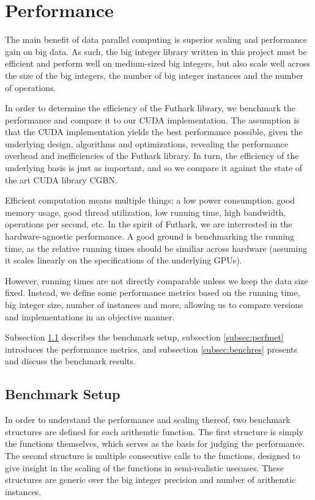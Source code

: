 \section{Performance}
\label{sec:per}

The main benefit of data parallel computing is superior scaling and performance
gain on big data. As such, the big integer library written in this project must
be efficient and perform well on medium-sized big integers, but also scale well
across the size of the big integers, the number of big integer instances and the
number of operations.

In order to determine the efficiency of the Futhark library, we benchmark the
performance and compare it to our CUDA implementation. The assumption is that
the CUDA implementation yields the best performance possible, given the
underlying design, algorithms and optimizations, revealing the performance
overhead and inefficiencies of the Futhark library. In turn, the efficiency of
the underlying basis is just as important, and so we compare it against the
state of the art CUDA library CGBN.

Efficient computation means multiple things; a low power consumption, good
memory usage, good thread utilization, low running time, high bandwidth,
operations per second, etc. In the spirit of Futhark, we are interrested in the
hardware-agnostic performance. A good ground is benchmarking the running time,
as the relative running times should be similiar across hardware (assuming it
scales linearly on the specifications of the underlying GPUs).

However, running times are not directly comparable unless we keep the data size
fixed. Instead, we define some performance metrics based on the running time,
big integer size, number of instances and more, allowing us to compare versions
and implementations in an objective manner.

Subsection \ref{subsec:benchset} describes the benchmark setup, subsection
\ref{subsec:perfmet} introduces the performance metrics, and subsection
\ref{subsec:benchres} presents and discuss the benchmark results.

\subsection{Benchmark Setup}
\label{subsec:benchset}

In order to understand the performance and scaling thereof, two benchmark
structures are defined for each arithemtic function. The first structure is
simply the functions themselves, which serves as the basis for judging the
performance. The second structure is multiple consecutive calls to the
functions, designed to give insight in the scaling of the functions in
semi-realistic usecases. These structures are generic over the big integer
precision and number of arithemtic instances.

